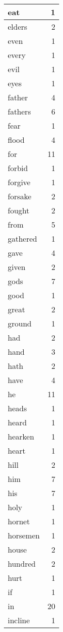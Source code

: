 \begin{center}
\begin{longtable}{l|r}
eat & 1\\ \hline 
elders & 2\\ \hline 
even & 1\\ \hline 
every & 1\\ \hline 
evil & 1\\ \hline 
eyes & 1\\ \hline 
father & 4\\ \hline 
fathers & 6\\ \hline 
fear & 1\\ \hline 
flood & 4\\ \hline 
for & 11\\ \hline 
forbid & 1\\ \hline 
forgive & 1\\ \hline 
forsake & 2\\ \hline 
fought & 2\\ \hline 
from & 5\\ \hline 
gathered & 1\\ \hline 
gave & 4\\ \hline 
given & 2\\ \hline 
gods & 7\\ \hline 
good & 1\\ \hline 
great & 2\\ \hline 
ground & 1\\ \hline 
had & 2\\ \hline 
hand & 3\\ \hline 
hath & 2\\ \hline 
have & 4\\ \hline 
he & 11\\ \hline 
heads & 1\\ \hline 
heard & 1\\ \hline 
hearken & 1\\ \hline 
heart & 1\\ \hline 
hill & 2\\ \hline 
him & 7\\ \hline 
his & 7\\ \hline 
holy & 1\\ \hline 
hornet & 1\\ \hline 
horsemen & 1\\ \hline 
house & 2\\ \hline 
hundred & 2\\ \hline 
hurt & 1\\ \hline 
if & 1\\ \hline 
in & 20\\ \hline 
incline & 1\\ \hline 

\end{longtable}
\end{center}
